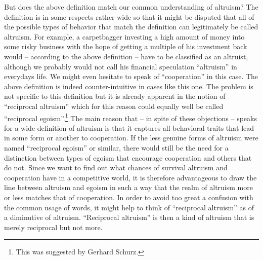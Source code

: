 But does the above definition match our common understanding of altruism? The
definition is in some respects rather wide so that it might be disputed that
all of the possible types of behavior that match the definition can
legitimately be called altruism. For example, a carpetbagger investing a high
amount of money into some risky business with the hope of getting a multiple
of his investment back would -- according to the above definition -- have to
be classified as an altruist, although we probably would not call his
financial speculation ``altruism'' in everydays life. We might even hesitate
to speak of ``cooperation'' in this case. The above definition is indeed
counter-intuitive in cases like this one. The problem is not specific to this
definition but it is already apparent in the notion of ``reciprocal altruism''
which for this reason could equally well be called ``reciprocal
egoism''.\footnote{This was suggested by Gerhard Schurz.} The main reason that
-- in spite of these objections -- speaks for a wide definition of altruism is
that it captures all behavioral traits that lead in some form or another to
cooperation. If the less genuine forms of altruism were named ``reciprocal
egoism'' or similar, there would still be the need for a distinction between types
of egoism that encourage cooperation and others that do not. Since we want to
find out what chances of survival altruism and cooperation have in a competitive world, it is therefore advantageous to draw the line between altruism
and egoism in such a way that the realm of altruism more or less matches that
of cooperation. In order to avoid too great a confusion with the common usage
of words, it might help to think of ``reciprocal altruism'' as of a diminutive
of altruism. ``Reciprocal altruism'' is then a kind of altruism that is merely
reciprocal but not more.

